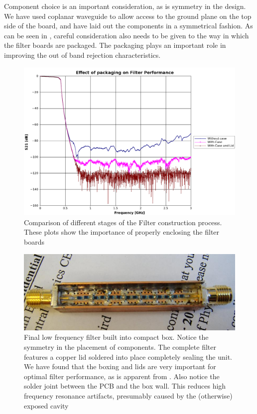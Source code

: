 Component choice is an important consideration, as is symmetry in the design. We have used coplanar waveguide to allow access to the ground plane on the top side of the board, and have laid out the components in a symmetrical fashion. As can be seen in , careful consideration also needs to be given to the way in which the filter boards are packaged. The packaging plays an important role in improving the out of band rejection characteristics.

\begin{figure}
 \centering
 \includegraphics[width=\textwidth]{./images/LowFrequencyFilters/filterBoxing.png}
 \caption{Comparison of different stages of the Filter construction process. These plots show the importance of properly enclosing the filter boards}
 \label{fig:filterBoxing}
\end{figure}

\begin{figure}
 \includegraphics[width=\textwidth]{./images/LowFrequencyFilters/DSC03823a.jpg}
\caption{Final low frequency filter built into compact box. Notice the symmetry in the placement of components. The complete filter features a copper lid soldered into place completely sealing the unit. We have found that the boxing and lids are very important for optimal filter performance, as is apparent from . Also notice the solder joint between the PCB and the box wall. This reduces high frequency resonance artifacts, presumably caused by the (otherwise) exposed cavity}
\end{figure}

